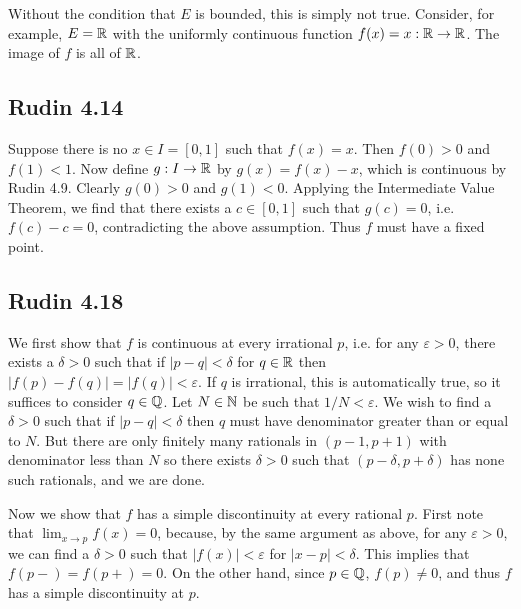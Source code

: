 \documentclass{../mathnotes}
\begin{document}
Without the condition that $E$ is bounded, this is simply not true. Consider,
for example, $E=\mathbb{R}$ with the uniformly continuous function $f(x)=x:\mathbb{R}\to\mathbb{R}$.
The image of $f$ is all of $\mathbb{R}$.

\subsection*{Rudin 4.14}

Suppose there is no $x\in I=[0,1]$ such that $f(x)=x$. Then $f(0)>0$ and $f(1)<1$.
Now define $g:I\to\mathbb{R}$ by $g(x)=f(x)-x$, which is continuous by Rudin 4.9. Clearly
$g(0)>0$ and $g(1)<0$. Applying the Intermediate Value Theorem, we find that there
exists a $c\in[0,1]$ such that $g(c)=0$, i.e. $f(c)-c=0$, contradicting the above
assumption. Thus $f$ must have a fixed point.

\subsection*{Rudin 4.18}

We first show that $f$ is continuous at every irrational $p$, i.e. for any $\varepsilon>0$,
there exists a $\delta>0$ such that if $|p-q|<\delta$ for $q\in\mathbb{R}$ then
$|f(p)-f(q)|=|f(q)|<\varepsilon$. If $q$ is irrational, this is automatically true, so it
suffices to consider $q\in\mathbb{Q}$. Let $N\in\mathbb{N}$ be such that
$1/N<\varepsilon$. We wish to find a $\delta>0$ such that if $|p-q|<\delta$ then
$q$ must have denominator greater than or equal to $N$. But there are only finitely
many rationals in $(p-1,p+1)$ with denominator less than $N$ so there exists $\delta>0$
such that $(p-\delta,p+\delta)$ has none such rationals, and we are done.

Now we show that $f$ has a simple discontinuity at every rational $p$. First note
that $\lim_{x\to p}f(x)=0$, because, by the same argument as above, for any $\varepsilon>0$,
we can find a $\delta>0$ such that $|f(x)|<\varepsilon$ for $|x-p|<\delta$. This implies that
$f(p-)=f(p+)=0$. On the other hand, since $p\in\mathbb{Q}$, $f(p)\neq 0$, and thus $f$ has a simple
discontinuity at $p$.
\end{document}
